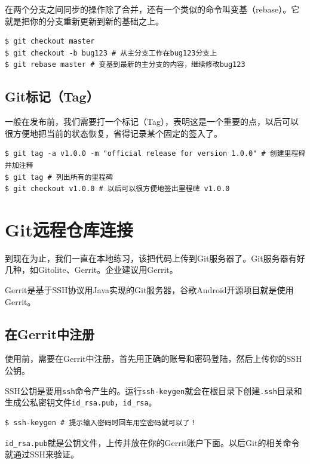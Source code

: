在两个分支之间同步的操作除了合并，还有一个类似的命令叫变基（rebase）。它就是把你的分支重新更新到新的基础之上。

\begin{verbatim}
$ git checkout master 
$ git checkout -b bug123 # 从主分支工作在bug123分支上
$ git rebase master # 变基到最新的主分支的内容，继续修改bug123
\end{verbatim}

\subsection{Git标记（Tag）}
\label{git标记（tag）}

一般在发布前，我们需要打一个标记（Tag），表明这是一个重要的点，以后可以很方便地把当前的状态恢复，省得记录某个固定的签入了。

\begin{verbatim}
$ git tag -a v1.0.0 -m "official release for version 1.0.0" # 创建里程碑并加注释
$ git tag # 列出所有的里程碑
$ git checkout v1.0.0 # 以后可以很方便地签出里程碑 v1.0.0
\end{verbatim}

\section{Git远程仓库连接}
\label{git远程仓库连接}

到现在为止，我们一直在本地练习，该把代码上传到Git服务器了。Git服务器有好几种，如Gitolite、Gerrit。企业建议用Gerrit。

Gerrit是基于SSH协议用Java实现的Git服务器，谷歌Android开源项目就是使用Gerrit。

\subsection{在Gerrit中注册}
\label{在gerrit中注册}

使用前，需要在Gerrit中注册，首先用正确的账号和密码登陆，然后上传你的SSH公钥。

SSH公钥是要用\texttt{ssh}命令产生的。运行\texttt{ssh-keygen}就会在根目录下创建\texttt{.ssh}目录和生成公私密钥文件\texttt{id\_rsa.pub}，\texttt{id\_rsa}。

\begin{verbatim}
$ ssh-keygen # 提示输入密码时回车用空密码就可以了！
\end{verbatim}

\texttt{id\_rsa.pub}就是公钥文件，上传并放在你的Gerrit账户下面。以后Git的相关命令就通过SSH来验证。

